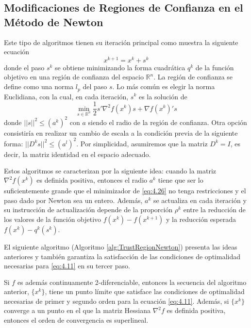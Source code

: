 \subsection{Modificaciones de Regiones de Confianza en el Método de Newton}

Este tipo de algoritmos tienen su iteración principal como muestra la siguiente ecuación
\begin{equation*}
x^{k+1} = x^k + s^k
\end{equation*}
donde el paso $s^k$ se obtiene minimizando la forma cuadrática $q^k$ de la función objetivo en una región de confianza del espacio $\mathbb{R}^n$. 
La región de confianza se define como una norma $l_p$ del paso $s$. 
Lo más común es elegir la norma Euclidiana, con la cual, en cada iteración, $s^k$ es la solución de 
\begin{equation*}
\min_{s\in\mathbb{R}^n}\dfrac{1}{2}s'\nabla^2 f(x^k)s + \nabla f(x^k)'s
\label{eq:4.26}
\end{equation*}
donde $||s||^2 \leq (a^k)^2$ con $a$ siendo el radio de la región de confianza. 
Otra opción consistiría en realizar un cambio de escala a la condición previa de la siguiente forma: $||D^ks||^2\leq (a^l)^2$. 
Por simplicidad, asumiremos que la matriz $D^k=I$, es decir, la matriz identidad en el espacio adecuado.

Estos algoritmos se caracterizan por la siguiente idea: cuando la matriz $\nabla^2 f(x^k)$ es definida positiva, entonces el radio $a^k$ tiene que ser lo suficientemente grande que el minimizador de \ref{eq:4.26} no tenga restricciones y el paso dado por Newton sea un entero. 
Además, $a^k$ se actualiza en cada iteración y su instrucción de actualización depende de la proporción $\rho^k$ entre la reducción de los valores de la función objetivo $f(x^k)-f(x^{k+1})$ y la reducción esperada $f(x^k)-q^k(s^k).$

El siguiente algoritmo (Algoritmo \ref{alg:TrustRegionNewton}) presenta las ideas anteriores y también garantiza la satisfacción de las condiciones de optimalidad necesarias para \ref{eq:4.11} en su tercer paso. 

Si $f$ es además continuamente 2-diferenciable, entonces la secuencia del algoritmo anterior, $\{x^k\}$, tiene un punto límite que satisface las condiciones de optimalidad necesarias de primer y segundo orden para la ecuación \ref{eq:4.11}. 
Además, si $\{x^k\}$ converge a un punto en el que la matriz Hessiana $\nabla^2f$ es definida positiva, entonces el orden de convergencia es superlineal. 

